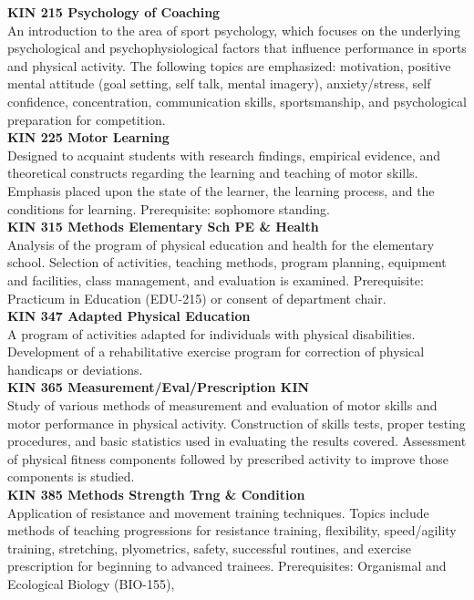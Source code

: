\documentclass[
  letterpaper,
]{scrbook}
\begin{document}
\textbf{KIN 215 Psychology of Coaching}\\
An introduction to the area of sport psychology, which focuses on the
underlying psychological and psychophysiological factors that influence
performance in sports and physical activity. The following topics are
emphasized: motivation, positive mental attitude (goal setting, self
talk, mental imagery), anxiety/stress, self confidence, concentration,
communication skills, sportsmanship, and psychological preparation for
competition.\\
\textbf{KIN 225 Motor Learning}\\
Designed to acquaint students with research findings, empirical
evidence, and theoretical constructs regarding the learning and teaching
of motor skills. Emphasis placed upon the state of the learner, the
learning process, and the conditions for learning. Prerequisite:
sophomore standing.\\
\textbf{KIN 315 Methods Elementary Sch PE \& Health}\\
Analysis of the program of physical education and health for the
elementary school. Selection of activities, teaching methods, program
planning, equipment and facilities, class management, and evaluation is
examined. Prerequisite: Practicum in Education (EDU-215) or consent of
department chair.\\
\textbf{KIN 347 Adapted Physical Education}\\
A program of activities adapted for individuals with physical
disabilities. Development of a rehabilitative exercise program for
correction of physical handicaps or deviations.\\
\textbf{KIN 365 Measurement/Eval/Prescription KIN}\\
Study of various methods of measurement and evaluation of motor skills
and motor performance in physical activity. Construction of skills
tests, proper testing procedures, and basic statistics used in
evaluating the results covered. Assessment of physical fitness
components followed by prescribed activity to improve those components
is studied.\\
\textbf{KIN 385 Methods Strength Trng \& Condition}\\
Application of resistance and movement training techniques. Topics
include methods of teaching progressions for resistance training,
flexibility, speed/agility training, stretching, plyometrics, safety,
successful routines, and exercise prescription for beginning to advanced
trainees. Prerequisites: Organismal and Ecological Biology (BIO-155),
\end{document}
